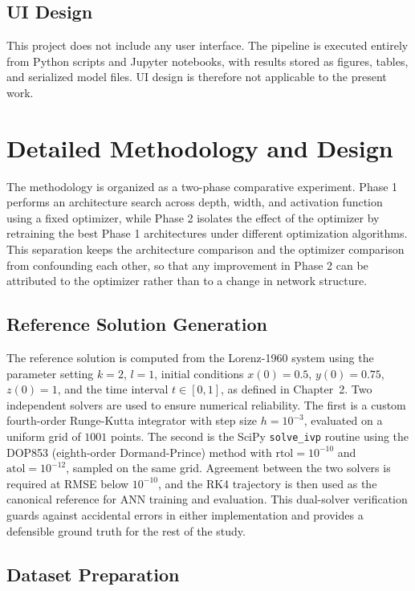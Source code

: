 \subsection{UI Design}

This project does not include any user interface. The pipeline is executed entirely from Python scripts and Jupyter notebooks, with results stored as figures, tables, and serialized model files. UI design is therefore not applicable to the present work.

\section{Detailed Methodology and Design}

The methodology is organized as a two-phase comparative experiment. Phase 1 performs an architecture search across depth, width, and activation function using a fixed optimizer, while Phase 2 isolates the effect of the optimizer by retraining the best Phase 1 architectures under different optimization algorithms. This separation keeps the architecture comparison and the optimizer comparison from confounding each other, so that any improvement in Phase 2 can be attributed to the optimizer rather than to a change in network structure.

\subsection{Reference Solution Generation}

The reference solution is computed from the Lorenz-1960 system using the parameter setting $k=2$, $l=1$, initial conditions $x(0)=0.5$, $y(0)=0.75$, $z(0)=1$, and the time interval $t \in [0, 1]$, as defined in Chapter~2. Two independent solvers are used to ensure numerical reliability. The first is a custom fourth-order Runge-Kutta integrator with step size $h=10^{-3}$, evaluated on a uniform grid of $1001$ points. The second is the SciPy \texttt{solve\_ivp} routine using the DOP853 (eighth-order Dormand-Prince) method with $\text{rtol}=10^{-10}$ and $\text{atol}=10^{-12}$, sampled on the same grid. Agreement between the two solvers is required at RMSE below $10^{-10}$, and the RK4 trajectory is then used as the canonical reference for ANN training and evaluation. This dual-solver verification guards against accidental errors in either implementation and provides a defensible ground truth for the rest of the study.

\subsection{Dataset Preparation}

